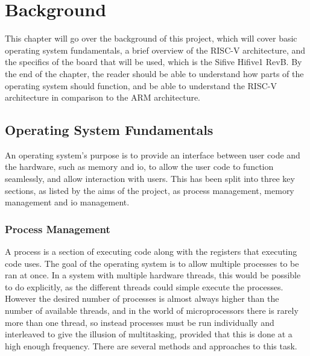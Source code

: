 \chapter[Background]{Background}
\label{cha:backgr}
This chapter will go over the background of this project, which will cover basic operating system fundamentals, a brief overview of the RISC-V architecture, and the specifics of the board that will be used, which is the Sifive Hifive1 RevB. By the end of the chapter, the reader should be able to understand how parts of the operating system should function, and be able to understand the RISC-V architecture in comparison to the ARM architecture.
\section{Operating System Fundamentals}
An operating system's purpose is to provide an interface between user code and the hardware, such as memory and \ac{io}, to allow the user code to function seamlessly, and allow interaction with users. This has been split into three key sections, as listed by the aims of the project, as process management, memory management and \ac{io} management.\cite{modern_operating}
\subsection{Process Management}
A process is a section of executing code along with the registers that executing code uses. The goal of the operating system is to allow multiple processes to be ran at once. In a system with multiple hardware threads, this would be possible to do explicitly, as the different threads could simple execute the processes. However the desired number of processes is almost always higher than the number of available threads, and in the world of microprocessors there is rarely more than one thread, so instead processes must be run individually and interleaved to give the illusion of multitasking, provided that this is done at a high enough frequency. There are several methods and approaches to this task. \cite{modern_operating}
